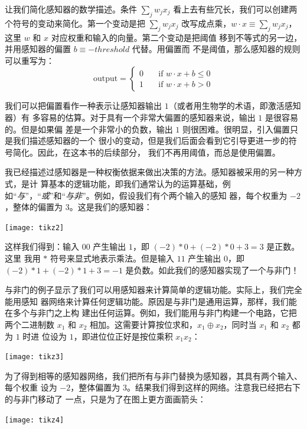 让我们简化感知器的数学描述。条件 $\sum_j w_j x_j$ 看上去有些冗长，我们可以创建两
个符号的变动来简化。第一个变动是把 $\sum_j w_j x_j$ 改写成点乘，$w \cdot x
\equiv \sum_j w_j x_j$，这里 $w$ 和 $x$ 对应权重和输入的向量。第二个变动是把阈值
移到不等式的另一边，并用感知器的偏置 $b \equiv -threshold$ 代替。用偏置而
不是阈值，那么感知器的规则可以重写为：
\begin{equation}
  \text{output} = \begin{cases}
    0 & \quad \text{if } w\cdot x + b \leq 0 \\
    1 & \quad \text{if } w\cdot x + b > 0
  \end{cases}
  \tag{2}
\end{equation}

我们可以把偏置看作一种表示让感知器输出 $1$（或者用生物学的术语，即激活感知器）有
多容易的估算。对于具有一个非常大偏置的感知器来说，输出 $1$ 是很容易的。但是如果偏
差是一个非常小的负数，输出 $1$ 则很困难。很明显，引入偏置只是我们描述感知器的一个
很小的变动，但是我们后面会看到它引导更进一步的符号简化。因此，在这本书的后续部分，
我们不再用阈值，而总是使用偏置。

我已经描述过感知器是一种权衡依据来做出决策的方法。感知器被采用的另一种方式，是计
算基本的逻辑功能，即我们通常认为的运算基础，例
如“\emph{与}”，“\emph{或}”和“\emph{与非}”。例如，假设我们有个两个输入的感知
器，每个权重为 $-2$，整体的偏置为 $3$。这是我们的感知器：
\begin{center}
  \texttt{[image: tikz2]}
\end{center}

这样我们得到：输入 $00$ 产生输出 $1$，即 $(-2)*0 + (-2)*0 + 3 = 3$ 是正数。这里
我用 $*$ 符号来显式地表示乘法。但是输入 $11$ 产生输出 $0$，即 $(-2)*1 + (-2)*1
+ 3 = -1$ 是负数。如此我们的感知器实现了一个与非门！

与非门的例子显示了我们可以用感知器来计算简单的逻辑功能。实际上，我们完全能用感知
器网络来计算任何逻辑功能。原因是与非门是通用运算，那样，我们能在多个与非门之上构
建出任何运算。例如，我们能用与非门构建一个电路，它把两个二进制数 $x_1$ 和 $x_2$
相加。这需要计算按位求和，$x_1 \oplus x_2$，同时当 $x_1$ 和 $x_2$ 都为 $1$ 时进
位设为 $1$，即进位位正好是按位乘积 $x_1x_2$：
\begin{center}
  \texttt{[image: tikz3]}
\end{center}

为了得到相等的感知器网络，我们把所有与非门替换为感知器，其具有两个输入、每个权重
设为 $-2$，整体偏置为 $3$。结果我们得到这样的网络。注意我已经把右下的与非门移动了
一点，只是为了在图上更方面画箭头：
\begin{center}
  \texttt{[image: tikz4]}
\end{center}

